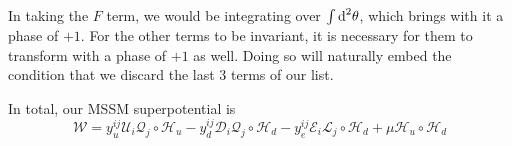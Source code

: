   In taking the $F$ term, we would be integrating over $\int \text{d}^2 \theta$, which brings with it a phase of $+1$. For the other terms to be invariant, it is necessary for them to transform with a phase of $+1$ as well. Doing so will naturally embed the condition that we discard the last 3 terms of our list.

  In total, our MSSM superpotential is
  \begin{equation}
    \mathcal{W} = y^{ij}_u \mathcal{U}_i \mathcal{Q}_j \circ \mathcal{H}_u - y^{ij}_d \mathcal{D}_i \mathcal{Q}_j \circ \mathcal{H}_d - y^{ij}_e \mathcal{E}_i \mathcal{L}_j \circ \mathcal{H}_d + \mu \mathcal{H}_u \circ \mathcal{H}_d
  \end{equation}
